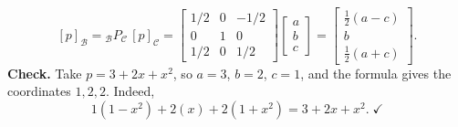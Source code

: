 \begin{example}
\begin{solution}
\[
[p]_{\mathcal{B}} = {}_{\mathcal{B}}P_{\mathcal{C}}\,[p]_{\mathcal{C}}
= \begin{bmatrix} 1/2 & 0 & -1/2 \\ 0 & 1 & 0 \\ 1/2 & 0 & 1/2 \end{bmatrix}\begin{bmatrix} a \\ b \\ c \end{bmatrix}
= \begin{bmatrix} \tfrac{1}{2}(a - c) \\ b \\ \tfrac{1}{2}(a + c) \end{bmatrix}.
\]
\textbf{Check.} Take $p = 3 + 2x + x^2$, so $a = 3$, $b = 2$, $c = 1$, and the formula gives the coordinates $1, 2, 2$. Indeed,
\[
1(1 - x^2) + 2(x) + 2(1 + x^2) = 3 + 2x + x^2. \;\checkmark
\]
\end{solution}
\end{example}